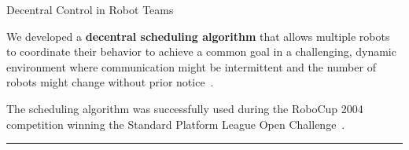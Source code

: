 

\begin{frame}{Decentral Control in Robot Teams}

\vspace{1em}
\justifying

We developed a {\bf decentral scheduling algorithm} that allows multiple robots 
to coordinate their behavior to achieve a common goal in a challenging, dynamic 
environment where communication might be intermittent and the number of robots 
might change without prior notice~\cite{Ziegler2004,Dahm2005a}. 
\vspace{1.5em}

\vspace{1.25em}
The scheduling algorithm was successfully used during the RoboCup 2004 
competition winning the Standard Platform League Open Challenge~\cite{Dahm2004}.

\begin{center}
\rule{2cm}{0.4pt}\\[0.5em]
\end{center}

\\[1em]

\end{frame}

